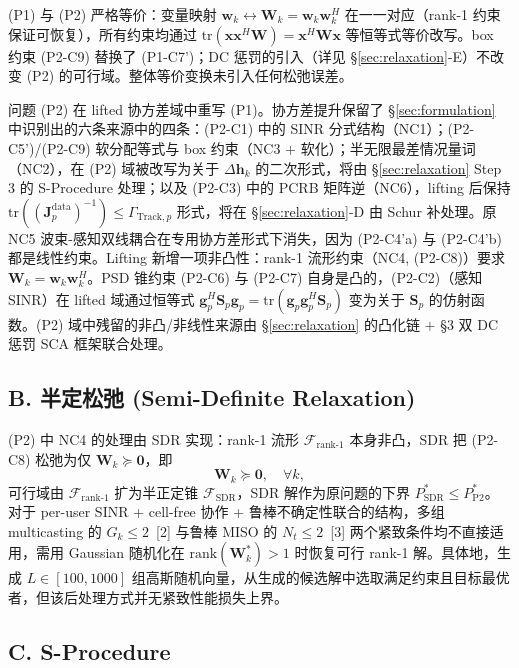 \documentclass[12pt,a4paper]{article}
\newcommand{\vect}[1]{\mathbf{#1}}
\newcommand{\mat}[1]{\mathbf{#1}}
\newcommand{\tr}{\text{tr}}
\begin{document}
(P1) 与 (P2) 严格等价：变量映射 $\vect{w}_k \leftrightarrow \mat{W}_k = \vect{w}_k \vect{w}_k^H$ 在一一对应（rank-1 约束保证可恢复），所有约束均通过 $\tr(\vect{x}\vect{x}^H \mat{W}) = \vect{x}^H \mat{W} \vect{x}$ 等恒等式等价改写。box 约束 (P2-C9) 替换了 (P1-C7')；DC 惩罚的引入（详见 \S\ref{sec:relaxation}-E）不改变 (P2) 的可行域。整体等价变换未引入任何松弛误差。

问题 (P2) 在 lifted 协方差域中重写 (P1)。协方差提升保留了 \S\ref{sec:formulation} 中识别出的六条来源中的四条：(P2-C1) 中的 SINR 分式结构（NC1）；(P2-C5')/(P2-C9) 软分配等式与 box 约束（NC3 + 软化）；半无限最差情况量词（NC2），在 (P2) 域被改写为关于 $\Delta\vect{h}_k$ 的二次形式，将由 \S\ref{sec:relaxation} Step 3 的 S-Procedure 处理；以及 (P2-C3) 中的 PCRB 矩阵逆（NC6），lifting 后保持 $\tr((\mat{J}_p^{\text{data}})^{-1}) \leq \Gamma_{\text{Track},p}$ 形式，将在 \S\ref{sec:relaxation}-D 由 Schur 补处理。原 NC5 波束-感知双线耦合在专用协方差形式下消失，因为 (P2-C4'a) 与 (P2-C4'b) 都是线性约束。Lifting 新增一项非凸性：rank-1 流形约束（NC4, (P2-C8)）要求 $\mat{W}_k = \vect{w}_k \vect{w}_k^H$。PSD 锥约束 (P2-C6) 与 (P2-C7) 自身是凸的，(P2-C2)（感知 SINR）在 lifted 域通过恒等式 $\vect{g}_p^H \mat{S}_p \vect{g}_p = \tr(\vect{g}_p \vect{g}_p^H \mat{S}_p)$ 变为关于 $\mat{S}_p$ 的仿射函数。(P2) 域中残留的非凸/非线性来源由 \S\ref{sec:relaxation} 的凸化链 + \S3 双 DC 惩罚 SCA 框架联合处理。

\subsection*{B. 半定松弛 (Semi-Definite Relaxation)}

(P2) 中 NC4 的处理由 SDR 实现：rank-1 流形 $\mathcal{F}_{\text{rank-1}}$ 本身非凸，SDR 把 (P2-C8) 松弛为仅 $\mat{W}_k \succeq \mat{0}$，即
\begin{equation}
\mat{W}_k \succeq \mat{0}, \quad \forall k, \tag{S1.1}
\end{equation}
可行域由 $\mathcal{F}_{\text{rank-1}}$ 扩为半正定锥 $\mathcal{F}_{\text{SDR}}$，SDR 解作为原问题的下界 $P_{\text{SDR}}^* \leq P_{\text{P2}}^*$。对于 per-user SINR + cell-free 协作 + 鲁棒不确定性联合的结构，多组 multicasting 的 $G_k \leq 2$~[2] 与鲁棒 MISO 的 $N_t \leq 2$~[3] 两个紧致条件均不直接适用，需用 Gaussian 随机化在 $\text{rank}(\mat{W}_k^*) > 1$ 时恢复可行 rank-1 解。具体地，生成 $L \in [100, 1000]$ 组高斯随机向量，从生成的候选解中选取满足约束且目标最优者，但该后处理方式并无紧致性能损失上界。

\subsection*{C. S-Procedure}
\end{document}
